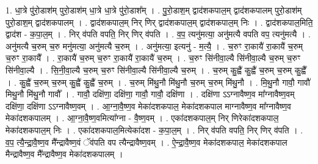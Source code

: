 \documentclass[17pt]{extarticle}
\begin{document}
1. धा॒त्रे पु॑रो॒डाश॑म् पुरो॒डाश॑म् धा॒त्रे धा॒त्रे पु॑रो॒डाश᳚म् । . पु॒रो॒डाश॒म् द्वाद॑शकपाल॒म् द्वाद॑शकपालम् पुरो॒डाश॑म् पुरो॒डाश॒म् द्वाद॑शकपालम् । . द्वाद॑शकपाल॒म् निर् णिर् द्वाद॑शकपाल॒म् द्वाद॑शकपाल॒म् निः । . द्वाद॑शकपाल॒मिति॒ द्वाद॑श - क॒पा॒ल॒म् । . निर् व॑पति वपति॒ निर् णिर् व॑पति । . व॒प॒ त्यनु॑मत्या॒ अनु॑मत्यै वपति वप॒ त्यनु॑मत्यै । . अनु॑मत्यै च॒रुम् च॒रु मनु॑मत्या॒ अनु॑मत्यै च॒रुम् । . अनु॑मत्या॒ इत्यनु॑ - म॒त्यै॒ । . च॒रुꣳ रा॒कायै॑ रा॒कायै॑ च॒रुम् च॒रुꣳ रा॒कायै᳚ । . रा॒कायै॑ च॒रुम् च॒रुꣳ रा॒कायै॑ रा॒कायै॑ च॒रुम् । . च॒रुꣳ सि॑नीवा॒ल्यै सि॑नीवा॒ल्यै च॒रुम् च॒रुꣳ सि॑नीवा॒ल्यै । . सि॒नी॒वा॒ल्यै च॒रुम् च॒रुꣳ सि॑नीवा॒ल्यै सि॑नीवा॒ल्यै च॒रुम् । . च॒रुम् कु॒ह्वै॑ कु॒ह्वै॑ च॒रुम् च॒रुम् कु॒ह्वै᳚ । . कु॒ह्वै॑ च॒रुम् च॒रुम् कु॒ह्वै॑ कु॒ह्वै॑ च॒रुम् । . च॒रुम् मि॑थु॒नौ मि॑थु॒नौ च॒रुम् च॒रुम् मि॑थु॒नौ । . मि॒थु॒नौ गावौ॒ गावौ॑ मिथु॒नौ मि॑थु॒नौ गावौ᳚ । . गावौ॒ दक्षि॑णा॒ दक्षि॑णा॒ गावौ॒ गावौ॒ दक्षि॑णा । . दक्षि॑णा ऽऽग्नावैष्ण॒व मा᳚ग्नावैष्ण॒वम् दक्षि॑णा॒ दक्षि॑णा ऽऽग्नावैष्ण॒वम् । . आ॒ग्ना॒वै॒ष्ण॒व मेका॑दशकपाल॒ मेका॑दशकपाल माग्नावैष्ण॒व मा᳚ग्नावैष्ण॒व मेका॑दशकपालम् । . आ॒ग्ना॒वै॒ष्ण॒वमित्या᳚ग्ना - वै॒ष्ण॒वम् । . एका॑दशकपाल॒म् निर् णिरेका॑दशकपाल॒ मेका॑दशकपाल॒म् निः । . एका॑दशकपाल॒मित्येका॑दश - क॒पा॒ल॒म् । . निर् व॑पति वपति॒ निर् णिर् व॑पति । . व॒प॒ त्यै॒न्द्रा॒वै॒ष्ण॒व मै᳚न्द्रावैष्ण॒वं ॅव॑पति वप त्यैन्द्रावैष्ण॒वम् । . ऐ॒न्द्रा॒वै॒ष्ण॒व मेका॑दशकपाल॒ मेका॑दशकपाल मैन्द्रावैष्ण॒व मै᳚न्द्रावैष्ण॒व मेका॑दशकपालम् । \newline
\end{document}

